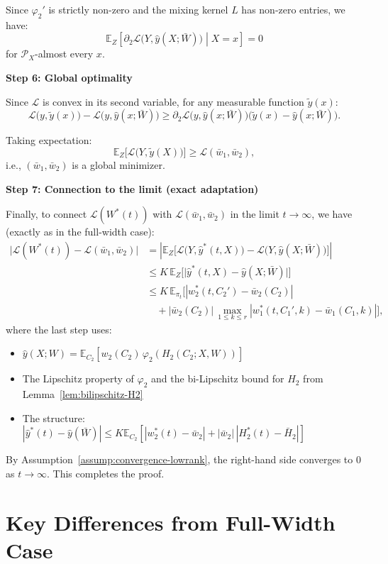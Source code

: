 \documentclass[11pt]{article}
\newcommand{\E}{\mathbb{E}}
\newcommand{\1}{\mathbbm{1}}
\begin{document}
Since $\varphi_2'$ is strictly non-zero and the mixing kernel $L$ has non-zero entries, we have:
\[
\E_{Z}\!\left[\partial_2\mathcal{L}\big(Y,\hat y(X;\bar{W})\big)\middle|X=x\right] = 0
\]
for $\mathcal{P}_X$-almost every $x$.

\textbf{Step 6: Global optimality}

Since $\mathcal{L}$ is convex in its second variable, for any measurable function $\tilde{y}(x)$:
\[
\mathcal{L}\big(y,\tilde{y}(x)\big)-\mathcal{L}\big(y,\hat y(x;\bar{W})\big) \ge \partial_2\mathcal{L}\big(y,\hat y(x;\bar{W})\big)\big(\tilde{y}(x)-\hat y(x;\bar{W})\big).
\]

Taking expectation:
\[
\E_Z\big[\mathcal{L}\big(Y,\tilde{y}(X)\big)\big] \ge \mathscr{L}(\bar{w}_1,\bar{w}_2),
\]
i.e., $(\bar{w}_1,\bar{w}_2)$ is a global minimizer.

\textbf{Step 7: Connection to the limit (exact adaptation)}

Finally, to connect $\mathscr{L}(W^*(t))$ with $\mathscr{L}(\bar{w}_1,\bar{w}_2)$ in the limit $t\to\infty$, we have (exactly as in the full-width case):
\begin{align*}
\big|\mathscr{L}(W^*(t))-\mathscr{L}(\bar{w}_1,\bar{w}_2)\big| &= \left|\E_Z\big[\mathcal{L}\big(Y,\hat y^*(t,X)\big)-\mathcal{L}\big(Y,\hat y(X;\bar{W})\big)\big]\right|\\
&\le K\,\E_Z\big[\big|\hat y^*(t,X)-\hat y(X;\bar{W})\big|\big]\\
&\le K\,\E_{\pi_t}\Big[|w_2^*(t,C_2')-\bar{w}_2(C_2)|\\
&\quad + |\bar{w}_2(C_2)|\,\max_{1\le k\le r}|w_1^*(t,C_1',k)-\bar{w}_1(C_1,k)|\Big],
\end{align*}
where the last step uses:
\begin{itemize}
\item $\hat y(X;W) = \E_{C_2}[w_2(C_2)\,\varphi_2(H_2(C_2;X,W))]$
\item The Lipschitz property of $\varphi_2$ and the bi-Lipschitz bound for $H_2$ from Lemma~\ref{lem:bilipschitz-H2}
\item The structure: $|\hat y^*(t)-\hat y(\bar{W})|\le K\E_{C_2}[|w_2^*(t)-\bar{w}_2| + |\bar{w}_2|\,|H_2^*(t)-\bar{H}_2|]$
\end{itemize}

By Assumption~\ref{assump:convergence-lowrank}, the right-hand side converges to $0$ as $t\to\infty$. This completes the proof.

\section{Key Differences from Full-Width Case}
\end{document}
